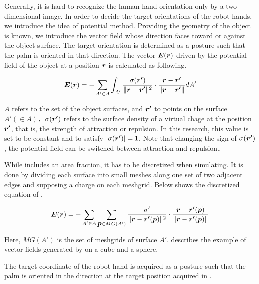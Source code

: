Generally, it is hard to recognize the human hand orientation only by a two dimensional image. In order to decide the target orientations of the robot hands, we introduce the idea of potential method.
Providing the geometry of the object is known, we introduce the vector field whose direction faces toward or against the object surface. The target orientation is determined as a posture such that the palm is oriented in that direction. The vector \(\mbox{\boldmath $E$}(\mbox{\boldmath $r$})\) driven by the potential field of the object at a position \(\mbox{\boldmath $r$}\) is calculated as following.

\vspace{-3mm}
\begin{equation}
  \label{equation:electronic_potential}
  \mbox{\boldmath $E$}(\mbox{\boldmath $r$}) = - \sum_{A' \in A}{ \int_{A'} \frac {\sigma (\mbox{\boldmath $r'$})} {\| \mbox{\boldmath $r$} - \mbox{\boldmath $r'$} \| ^ 2} \cdot \frac {\mbox{\boldmath $r$} - \mbox{\boldmath $r'$}} {\| \mbox{\boldmath $r$} - \mbox{\boldmath $r'$} \|} dA' }
\end{equation}

\(A\) refers to the set of the object surfaces, and \(\mbox{\boldmath $r'$}\) to points on the surface \(A' (\in A)\)．\(\sigma (\mbox{\boldmath $r'$})\) refers to the surface density of a virtual chage at the position \(\mbox{\boldmath $r'$}\), that is, the strength of attraction or repulsion. In this research, this value is set to be constant and to satisfy \(|\sigma (\mbox{\boldmath $r'$})| = 1\). Note that changing the sign of \(\sigma (\mbox{\boldmath $r'$})\), the potential field can be switched between attraction and repulsion．\par
While  includes an area fraction, it has to be discretized when simulating. It is done by dividing each surface into small meshes along one set of two adjacent edges and supposing a charge on each meshgrid. Below shows the discretized equation of .

\vspace{-3mm}
\begin{equation}
  \label{equation:electronic_potential_simple}
  \mbox{\boldmath $E$}(\mbox{\boldmath $r$}) = - \sum_{A' \in A} {\sum_{\mbox{\boldmath $p$} \in MG(A')} { \frac {\sigma'} {\| \mbox{\boldmath $r$} - \mbox{\boldmath $r'$}(\mbox{\boldmath $p$}) \| ^ 2} \cdot \frac {\mbox{\boldmath $r$} - \mbox{\boldmath $r'$}(\mbox{\boldmath $p$})} {\| \mbox{\boldmath $r$} - \mbox{\boldmath $r'$}(\mbox{\boldmath $p$}) \|} } }
\end{equation}

Here, \(MG(A')\) is the set of meshgrids of surface \(A'\).
 describes the example of vector fields generated by  on a cube and a sphere.\par
The target coordinate of the robot hand is acquired as a posture such that the palm is oriented in the direction at the target position acquired in .
